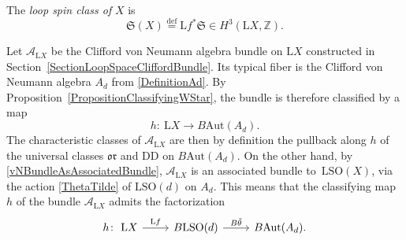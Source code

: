 \documentclass[pdftex]{sigma}
\numberwithin{equation}{section}
\newcommand{\Z}{\mathbb{Z}}
\newcommand{\A}{\mathcal{A}}
\newcommand{\SO}{\mathrm{SO}}
\newcommand{\Aut}{\mathrm{Aut}}
\renewcommand{\L}{\mathrm{L}}
\newcommand{\DD}{\mathrm{DD}}
\newcommand{\defeq}{\stackrel{\mathrm{def}}{=}}
\newcommand{\oclass}{\mathfrak{or}}
\begin{document}
\begin{Definition}
The \emph{loop spin class of} $X$ is
\begin{equation*}
\mathfrak{S}(X) \defeq \L f^* \mathfrak{S} \in H^3(\L X, \Z).
\end{equation*}
\end{Definition}

Let $\A_{\L X}$ be the Clifford von Neumann algebra bundle on $\L X$ constructed in Section~\ref{SectionLoopSpaceCliffordBundle}.
Its typical fiber is the Clifford von Neumann algebra $A_d$ from \eqref{DefinitionAd}.
By Proposition~\ref{PropositionClassifyingWStar}, the bundle is therefore classified by a map
\begin{equation*}
h\colon\ \L X \longrightarrow B\Aut(A_d).
\end{equation*}
The characteristic classes of $\A_{\L X}$ are then by definition the pullback along $h$ of the universal classes $\oclass$ and $\DD$ on $B\Aut(A_d)$. On the other hand, by \eqref{vNBundleAsAssociatedBundle}, $\A_{\L X}$ is an associated bundle to~$\L\SO(X)$, via the action \eqref{ThetaTilde} of $\L\SO(d)$ on $A_d$.
This means that the classifying map $h$ of the bundle $\A_{\L X}$ admits the factorization
\begin{equation*}
\begin{tikzcd}
 h \colon\ \L X \ar[r, "\L f"] %
 & B \L \SO(d) \ar[r, "B\tilde{\theta}"] & B\Aut(A_d).
\end{tikzcd}
\end{equation*}
\end{document}
